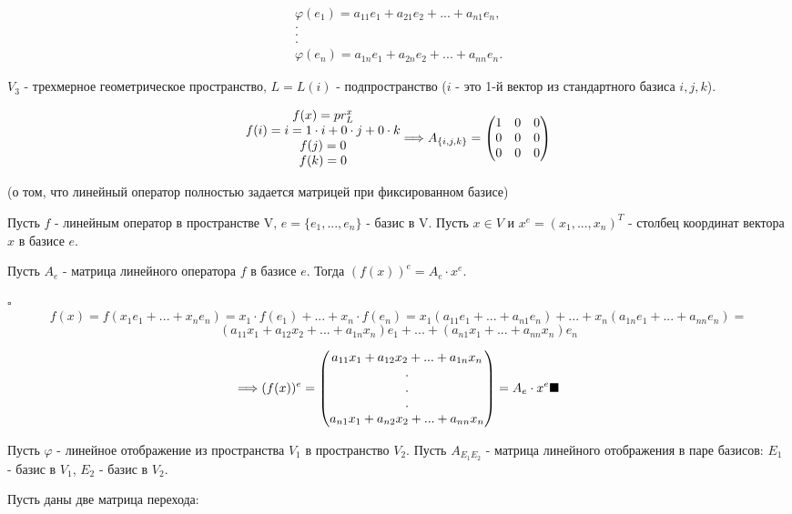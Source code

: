 \documentclass[../main.tex]{subfiles}
\begin{document}
$$\begin{matrix}
    \varphi(e_1) = a_{11} e_1 + a_{21} e_2 + ... + a_{n1} e_n,\\
    .\\
    .\\
    .\\
    \varphi(e_n) = a_{1n} e_1 + a_{2n} e_2 + ... + a_{nn} e_n.
\end{matrix}$$

\void{} $V_3$ - трехмерное геометрическое пространство, $L = L(i)$ - подпространство ($i$ - это 1-й вектор из стандартного базиса $i,j,k$).

$$
\begin{matrix}
    f(x) = pr_L^x\\
    f(i) = i = 1\cdot i + 0\cdot j + 0\cdot k\\
    f(j) = 0\\
    f(k) = 0
\end{matrix}
\Longrightarrow A_{\{i,j,k\}} =
\begin{pmatrix} 1&0&0\\0&0&0\\0&0&0\end{pmatrix}
$$

\void{} (о том, что линейный оператор полностью задается матрицей при фиксированном базисе)

Пусть $f$ - линейным оператор в пространстве V, $e = \{e_1,...,e_n\}$ - базис в V. Пусть $x\in V$ и
$x^e = (x_1,...,x_n)^T$ - столбец координат вектора $x$ в базисе $e$.

Пусть $A_e$ - матрица линейного оператора $f$ в базисе $e$. Тогда $(f(x))^e = A_e\cdot x^e$.

\void $\square$ 
$$
f(x) = f(x_1e_1 + ... + x_n e_n) = x_1\cdot f(e_1) + ... + x_n\cdot f(e_n) =
x_1(a_{11}e_1 + ... + a_{n1}e_n) + ... + x_n(a_{1n}e_1 + ... + a_{nn}e_n) =$$
$$
(a_{11}x_1 + a_{12}x_2 + ... + a_{1n}x_n)e_1 + ... + (a_{n1}x_1+...+a_{nn}x_n)e_n
$$

$$
\Longrightarrow (f(x))^e =
\begin{pmatrix} 
    a_{11}x_1 + a_{12}x_2 + ... + a_{1n}x_n\\
    .\\
    .\\
    .\\
    a_{n1}x_1 + a_{n2}x_2 + ... + a_{nn}x_n
\end{pmatrix} = A_e\cdot x^e \blacksquare
$$

\void{} Пусть $\varphi$ - линейное отображение из пространства $V_1$ в пространство $V_2$.
Пусть $A_{E_1E_2}$ - матрица линейного отображения в паре базисов: $E_1$ - базис в $V_1$, $E_2$ - базис в $V_2$.

Пусть даны две матрица перехода:
\end{document}
